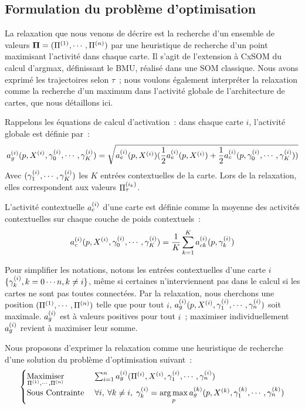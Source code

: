 \documentclass[../main]{subfiles}
\begin{document}
\subsection{Formulation du problème d'optimisation}\label{sec:formulation_argmax}

La relaxation que nous venons de décrire est la recherche d'un ensemble de valeurs $\mathbf{\Pi} = (\Pi^{({1})}, \cdots, \Pi^{({n})})$ par une heuristique de recherche d'un point maximisant l'activité dans chaque carte. Il s'agit de l'extension à CxSOM du calcul d'argmax, définissant le BMU, réalisé dans une SOM classique. 
Nous avons exprimé les trajectoires selon $\tau$~; nous voulons également interpréter la relaxation comme la recherche d'un maximum dans l'activité globale de l'architecture de cartes, que nous détaillons ici. 

Rappelons les équations de calcul d'activation~:
dans chaque carte $i$, l'activité globale est définie par~:
\begin{equation}\label{eq:ag}
	a_g^{({i})}(p, X^{({i})}, \gamma^{({i})}_0, \cdots, \gamma^{({i})}_K) = \sqrt{a_e^{({i})}(p,X^{({i})})(\frac{1}{2}a_e^{({i})}(p,X^{({i})}) + \frac{1}{2}a_c^{({i})}(p,\gamma^{({i})}_0, \cdots, \gamma^{({i})}_K))}
\end{equation}
Avec $(\gamma^{({i})}_1, \cdots, \gamma^{({i})}_K)$ les $K$ entrées contextuelles de la carte. Lors de la relaxation, elles correspondent aux valeurs $\Pi^{({i_k})}_\tau$.

L'activité contextuelle $a_c^{({i})}$ d'une carte est définie comme la moyenne des activités contextuelles sur chaque couche de poids contextuels~:
\begin{equation}
	a_c^{({i})}(p,  X^{({i})}, \gamma^{({i})}_0, \cdots, \gamma^{({i})}_K) = \frac{1}{K}\sum_{k=1}^{K}{a_{ck}^{({i})}(p, \gamma^{({i})}_k)}
\end{equation}

Pour simplifier les notations, notons les entrées contextuelles d'une carte $i$ $\{ \gamma^{({i})}_k, k = 0 \cdots n , k \neq i  \}$, même si certaines n'interviennent pas dans le calcul si les cartes ne sont pas toutes connectées.
Par la relaxation, nous cherchons une position $(\Pi^{({1})}, \cdots, \Pi^{({n})})$ telle que pour tout $i$, $a_g^{({i})}(p,  X^{({i})}, \gamma^{({i})}_1, \cdots, \gamma^{({i})}_n)$ soit maximale. 
$a_g^{({i})}$ est à valeurs positives pour tout $i$~; maximiser individuellement $a_g^{({i})}$ revient à maximiser leur somme.

Nous proposons d'exprimer la relaxation comme une heuristique de recherche d'une solution du problème d'optimisation suivant~:
\begin{equation}\label{eq:opti}
	\begin{cases}
	\operatorname*{Maximiser}\limits_{\Pi^{({1})}, \cdots, \Pi^{({n})}}\;& \sum_{i = 1}^n a_g^{({i})}(\Pi^{({i})},X^{({i})},\gamma_1^{({i})}, \cdots, \gamma_n^{({i})}) \\
	\text{Sous Contrainte}\; &\forall i,\:\forall k \neq i, \; \gamma_k^{({i})} = \operatorname*{arg\,max}\limits_p a_g^{({k})}(p, X^{({k})}, \gamma_1^{({k})}, \cdots, \gamma_n^{({k})})
	\end{cases}
\end{equation}
\end{document}
